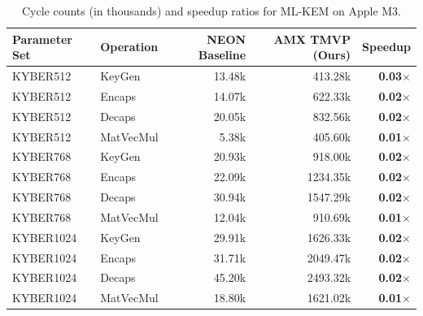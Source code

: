 \begin{table}[ht]
\centering
\caption{Cycle counts (in thousands) and speedup ratios for ML-KEM on Apple M3.}
\label{tab:mlkem_m3}
\begin{tabular}{l l r r r}
\hline
\textbf{Parameter Set} & \textbf{Operation} & \textbf{NEON Baseline} & \textbf{AMX TMVP (Ours)} & \textbf{Speedup} \\
\hline
KYBER512 & KeyGen & 13.48k & 413.28k & \textbf{0.03$\times$} \\
KYBER512 & Encaps & 14.07k & 622.33k & \textbf{0.02$\times$} \\
KYBER512 & Decaps & 20.05k & 832.56k & \textbf{0.02$\times$} \\
KYBER512 & MatVecMul & 5.38k & 405.60k & \textbf{0.01$\times$} \\
\hline
KYBER768 & KeyGen & 20.93k & 918.00k & \textbf{0.02$\times$} \\
KYBER768 & Encaps & 22.09k & 1234.35k & \textbf{0.02$\times$} \\
KYBER768 & Decaps & 30.94k & 1547.29k & \textbf{0.02$\times$} \\
KYBER768 & MatVecMul & 12.04k & 910.69k & \textbf{0.01$\times$} \\
\hline
KYBER1024 & KeyGen & 29.91k & 1626.33k & \textbf{0.02$\times$} \\
KYBER1024 & Encaps & 31.71k & 2049.47k & \textbf{0.02$\times$} \\
KYBER1024 & Decaps & 45.20k & 2493.32k & \textbf{0.02$\times$} \\
KYBER1024 & MatVecMul & 18.80k & 1621.02k & \textbf{0.01$\times$} \\
\hline
\end{tabular}
\end{table}